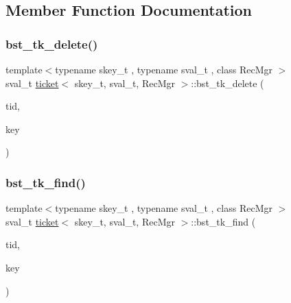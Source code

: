 \subsection{Member Function Documentation}
\mbox{\label{classticket_a4fc1111d09c54bc5d7b40d26dde1efdf}} 
\subsubsection{\texorpdfstring{bst\+\_\+tk\+\_\+delete()}{bst\_tk\_delete()}}
{\footnotesize\ttfamily template$<$typename skey\+\_\+t , typename sval\+\_\+t , class Rec\+Mgr $>$ \\
sval\+\_\+t \hyperlink{classticket}{ticket}$<$ skey\+\_\+t, sval\+\_\+t, Rec\+Mgr $>$\+::bst\+\_\+tk\+\_\+delete (\begin{DoxyParamCaption}\item[{const int}]{tid,  }\item[{skey\+\_\+t}]{key }\end{DoxyParamCaption})}

\mbox{\label{classticket_a89a2bc20f3d0b46c9e0b94e43f5bc05f}} 
\subsubsection{\texorpdfstring{bst\+\_\+tk\+\_\+find()}{bst\_tk\_find()}}
{\footnotesize\ttfamily template$<$typename skey\+\_\+t , typename sval\+\_\+t , class Rec\+Mgr $>$ \\
sval\+\_\+t \hyperlink{classticket}{ticket}$<$ skey\+\_\+t, sval\+\_\+t, Rec\+Mgr $>$\+::bst\+\_\+tk\+\_\+find (\begin{DoxyParamCaption}\item[{const int}]{tid,  }\item[{skey\+\_\+t}]{key }\end{DoxyParamCaption})}

\mbox{\label{classticket_ad6c01e82fc3074b7bbbc0dbb3bb75c43}} 

